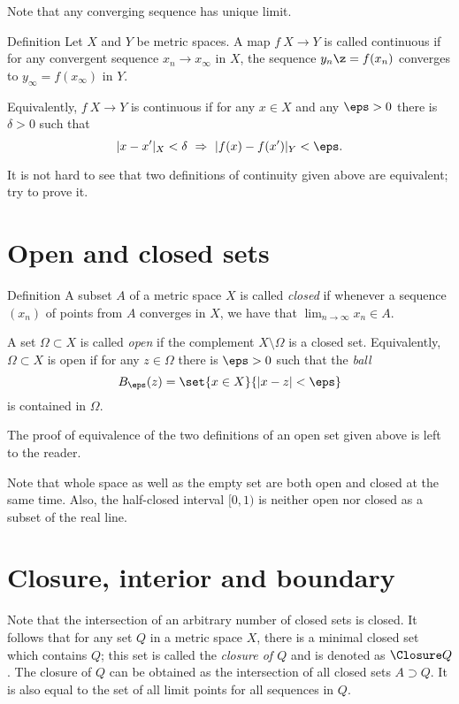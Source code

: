 Note that any converging sequence has unique limit.

\begin{thm}{Definition}
Let $X$ and $Y$ be metric spaces.
A map $f\:X\to Y$ is called continuous if for any convergent sequence $x_n\to x_\infty$ in $X$,
the sequence $y_n\z=f(x_n)$ converges to $y_\infty=f(x_\infty)$ in $Y$.

Equivalently, $f\:X\to Y$ is continuous if for any $x\in X$ and any $\eps>0$
there is $\delta>0$ such that 
$$|x-x'|_X<\delta\ \Rightarrow\ |f(x)-f(x')|_Y<\eps.$$

\end{thm}

It is not hard to see that two definitions of continuity given above are equivalent;
try to prove it.

\section*{Open and closed sets}

\begin{thm}{Definition}
A subset $A$ of a metric space $X$ is called \emph{closed} if whenever a sequence $(x_n)$ of points from $A$ converges in $X$, we have that $\lim_{n\to\infty} x_n \in A$.

A set $\Omega \subset X$ is called \emph{open} if the complement $X \setminus \Omega$ is a closed set.
Equivalently, $\Omega \subset X$ is open if for any $z\in \Omega$ 
there is $\eps>0$ such that the \emph{ball}
$$B_\eps(z)=\set{x\in X}{|x-z|<\eps}$$
is contained in $\Omega$.
\end{thm}


The proof of equivalence of the two definitions of an open set given above is left to the reader.

Note that whole space as well as the empty set are both open and closed at the same time.
Also, the half-closed interval $[0,1)$ is neither open nor closed as a subset of the real line.


\section*{Closure, interior and boundary}

Note that the intersection of an arbitrary number of closed sets is closed.
It follows that for any set $Q$ in a metric space $X$, there is a minimal closed set which contains $Q$;
this set is called the \emph{closure of $Q$} and is denoted as $\Closure Q$.
The closure of $Q$ can be obtained as the intersection of all closed sets $A\supset Q$.
It is also equal to the set of all limit points for all sequences in $Q$.


